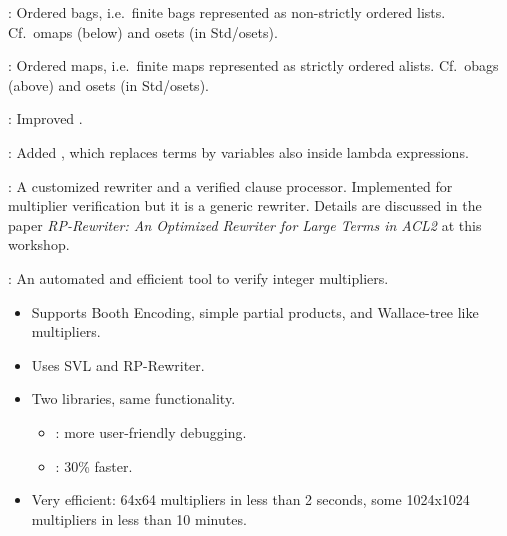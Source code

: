
\begin{frame}

\newlibtitle

:
Ordered bags, i.e.\ finite bags represented as non-strictly ordered lists.
Cf.\ omaps (below) and osets (in Std/osets).

\separation

:
Ordered maps, i.e.\ finite maps represented as strictly ordered alists.
Cf.\ obags (above) and osets (in Std/osets).

\separation

:
Improved .

\separation

:
Added ,
which replaces terms by variables also inside lambda expressions.

\end{frame}


\begin{frame}

\newlibtitle

:
A customized rewriter and a verified
clause processor. Implemented for multiplier verification but it is a
generic rewriter. Details are discussed in the paper {\it RP-Rewriter: An
Optimized Rewriter for Large Terms in ACL2} at this workshop.

\separation

:
An automated and efficient tool to verify integer multipliers.
\begin{itemize}
\item
Supports Booth Encoding,
simple partial products,
and Wallace-tree like multipliers.
\item Uses SVL and RP-Rewriter.
\item Two libraries, same  functionality.
  \begin{itemize}
  \item {}: more  user-friendly debugging.
  \item{}: 30\% faster.
  \end{itemize}
\item  Very efficient:  64x64  multipliers  in less  than  2 seconds,  some
  1024x1024 multipliers in less than 10 minutes.
\end{itemize}

\end{frame}

